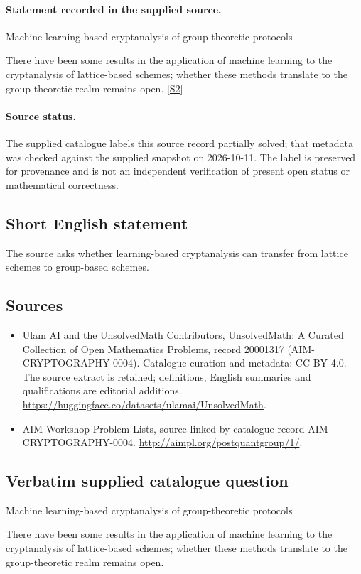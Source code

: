 \documentclass[11pt]{article}
\begin{document}
\paragraph{Statement recorded in the supplied source.}
Machine learning-based cryptanalysis of group-theoretic protocols

There have been some results in the application of machine learning to the cryptanalysis of lattice-based schemes; whether these methods translate to the group-theoretic realm remains open. \href{http://aimpl.org/postquantgroup/1/}{[S2]}
\paragraph{Source status.}
The supplied catalogue labels this source record partially solved; that metadata was checked against the supplied snapshot on 2026-10-11. The label is preserved for provenance and is not an independent verification of present open status or mathematical correctness.
\subsection{Short English statement}
The source asks whether learning-based cryptanalysis can transfer from lattice schemes to group-based schemes.
\subsection{Sources}
\begin{itemize}
\item[S1] Ulam AI and the UnsolvedMath Contributors, UnsolvedMath: A Curated Collection of Open Mathematics Problems, record 20001317 (AIM-CRYPTOGRAPHY-0004). Catalogue curation and metadata: CC BY 4.0. The source extract is retained; definitions, English summaries and qualifications are editorial additions.
\url{https://huggingface.co/datasets/ulamai/UnsolvedMath}.
\item[S2] AIM Workshop Problem Lists, source linked by catalogue record AIM-CRYPTOGRAPHY-0004.
\url{http://aimpl.org/postquantgroup/1/}.
\end{itemize}
\subsection{Verbatim supplied catalogue question}
Machine learning-based cryptanalysis of group-theoretic protocols

There have been some results in the application of machine learning to the cryptanalysis of lattice-based schemes; whether these methods translate to the group-theoretic realm remains open.
\end{document}
